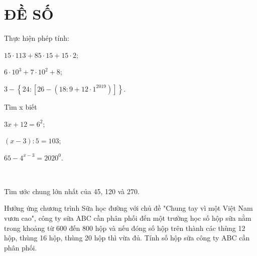 \section{ĐỀ SỐ \thesection } %
\setcounter{bt}{0}

\begin{bt} Thực hiện phép tính:
	\begin{listEX}[3]
	\item $15\cdot 113+85\cdot 15+15\cdot 2$;
 	\item$6\cdot 10^3+7\cdot 10^2+8$;
  	\item$3-\left\{24:\left[26-\left(18: 9+12\cdot 1^{2019}\right)\right]\right\}$.
\end{listEX}
	
\end{bt}

\begin{bt} Tìm x biết
	
	\begin{listEX}[3]
		\item $3 x+12=6^2$;
		\item $(x-3): 5=103$;
		\item $65-4^{x-3}=2020^0$.
	\end{listEX}
	
\end{bt}



\begin{bt}
	\
	\begin{listEX}
		\item Tìm ước chung lớn nhất của 45, 120 và 270.
		\item Hưởng ứng chương trình Sữa học đường với chủ đề "Chung tay vì một Việt Nam vươn cao", công ty sữa ABC cần phân phối đến một trường học số hộp sữa nằm trong khoảng từ 600 đến 800 hộp và nếu đóng số hộp trên thành các thùng 12 hộp, thùng 16 hộp, thùng 20 hộp thì vừa đủ. Tính số hộp sữa công ty ABC cần phân phối.
		
	\end{listEX}
	
\end{bt}



